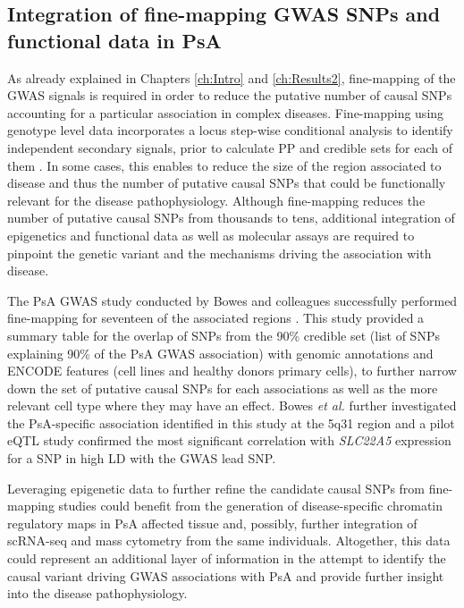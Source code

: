\subsection{Integration of fine-mapping GWAS SNPs and functional data in PsA}

As already explained in Chapters \ref{ch:Intro} and \ref{ch:Results2}, fine-mapping of the GWAS signals is required in order to reduce the putative number of causal SNPs accounting for a particular association in complex diseases. Fine-mapping using genotype level data incorporates a locus step-wise conditional analysis to identify independent secondary signals, prior to calculate PP and credible sets for each of them \parencite{Maller2012,Bunts2015}. In some cases, this enables to reduce the size of the region associated to disease and thus the number of putative causal SNPs that could be functionally relevant for the disease pathophysiology. Although fine-mapping reduces the number of putative causal SNPs from thousands to tens, additional integration of epigenetics and functional data as well as molecular assays are required to pinpoint the genetic variant and the mechanisms driving the association with disease.  

The PsA GWAS study conducted by Bowes and colleagues successfully performed fine-mapping for seventeen of the associated regions \parencite{Bowes2016}. This study provided a summary table for the overlap of SNPs from the 90\% credible set (list of SNPs explaining 90\% of the PsA GWAS association) with genomic annotations and ENCODE features (cell lines and healthy donors primary cells), to further narrow down the set of putative causal SNPs for each associations as well as the more relevant cell type where they may have an effect. Bowes \textit{et al.} further investigated the PsA-specific association identified in this study at the 5q31 region and a pilot eQTL study confirmed the most significant correlation with \textit{SLC22A5} expression for a SNP in high LD with the GWAS lead SNP.

Leveraging epigenetic data to further refine the candidate causal SNPs from fine-mapping studies could benefit from the generation of disease-specific chromatin regulatory maps in PsA affected tissue and, possibly, further integration of scRNA-seq and mass cytometry from the same individuals. Altogether, this data could represent an additional layer of information in the attempt to identify the causal variant driving GWAS associations with PsA and provide further insight into the disease pathophysiology. 

